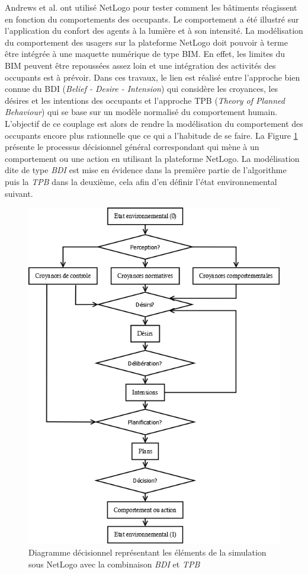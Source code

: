 Andrews et al. \cite{Andrews-11} ont utilisé NetLogo pour tester comment les bâtiments réagissent en fonction du comportements des occupants. Le comportement a été illustré sur l'application du confort des agents à la lumière et à son intensité. La modélisation du comportement des usagers sur la plateforme NetLogo doit pouvoir à terme être intégrée à une maquette numérique de type BIM. En effet, les limites du BIM peuvent être repoussées assez loin et une intégration des activités des occupants est à prévoir. Dans ces travaux, le lien est réalisé entre l'approche bien connue du BDI (\textit{Belief - Desire - Intension}) qui considère les croyances, les désires et les intentions des occupants et l'approche TPB (\textit{Theory of Planned Behaviour}) qui se base sur un modèle normalisé du comportement humain. L'objectif de ce couplage est alors de rendre la modélisation du comportement des occupants encore plus rationnelle que ce qui a l'habitude de se faire. La Figure \ref{fig:Diagramme_NetLogo} présente le processus décisionnel général correspondant qui mène à un comportement ou une action en utilisant la plateforme NetLogo. La modélisation dite de type \textit{BDI} est mise en évidence dans la première partie de l'algorithme puis la \textit{TPB} dans la deuxième, cela afin d'en définir l'état environnemental suivant.

\begin{figure}[H]
\centering
\includegraphics[scale=0.4]{Images/diagrammes_SMA/NetLogo}
\caption{Diagramme décisionnel représentant les éléments de la simulation sous NetLogo avec la combinaison \textit{BDI} et \textit{TPB}}
\label{fig:Diagramme_NetLogo}
\end{figure}

